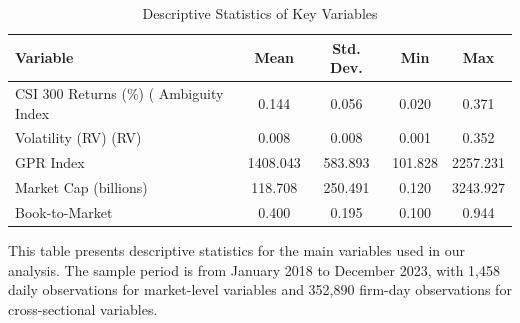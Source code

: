 




\begin{table}[htbp]
\centering
\caption{Descriptive Statistics of Key Variables}
\label{tab:descriptive_stats}
\begin{threeparttable}
\begin{tabular}{lcccc}
\toprule
Variable & Mean & Std. Dev. & Min & Max \\
\midrule
CSI 300 Returns (\%) (%
Ambiguity Index & 0.144 & 0.056 & 0.020 & 0.371 \\
Volatility (RV) (RV) & 0.008 & 0.008 & 0.001 & 0.352 \\
GPR Index & 1408.043 & 583.893 & 101.828 & 2257.231 \\
Market Cap (billions) & 118.708 & 250.491 & 0.120 & 3243.927 \\
Book-to-Market & 0.400 & 0.195 & 0.100 & 0.944 \\

\bottomrule
\end{tabular}
\begin{tablenotes}
\small
\item This table presents descriptive statistics for the main variables used in our analysis. The sample period is from January 2018 to December 2023, with 1,458 daily observations for market-level variables and 352,890 firm-day observations for cross-sectional variables.
\end{tablenotes}
\end{threeparttable}
\end{table}




